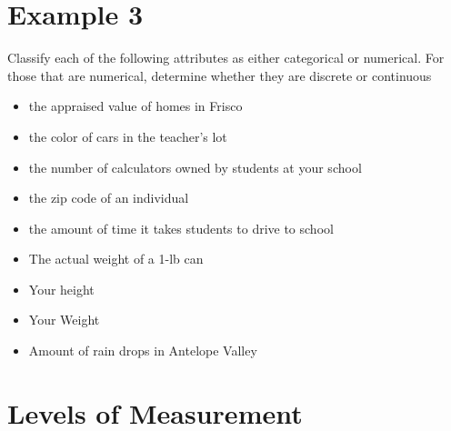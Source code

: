 \documentclass[]{book}
\providecommand{\tightlist}{%
  \setlength{\itemsep}{0pt}\setlength{\parskip}{0pt}}
\begin{document}
\hypertarget{example-3}{%
\section{Example 3}\label{example-3}}

Classify each of the following attributes as either categorical or numerical. For those that are numerical, determine whether they are discrete or continuous

\begin{itemize}
\tightlist
\item
  the appraised value of homes in Frisco
\item
  the color of cars in the teacher's lot
\item
  the number of calculators owned by students at your school
\item
  the zip code of an individual
\item
  the amount of time it takes students to drive to school\\
\item
  The actual weight of a 1-lb can
\item
  Your height
\item
  Your Weight
\item
  Amount of rain drops in Antelope Valley
\end{itemize}

\hypertarget{levels-of-measurement}{%
\section{Levels of Measurement}\label{levels-of-measurement}}
\end{document}
